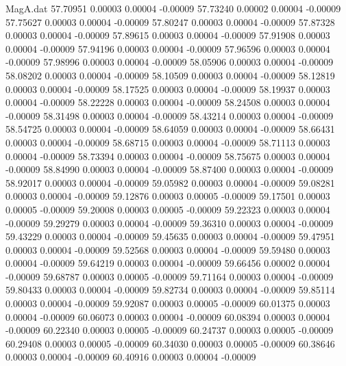 \begin{filecontents}{MagA.dat}
  57.70951    0.00003    0.00004   -0.00009
  57.73240    0.00002    0.00004   -0.00009
  57.75627    0.00003    0.00004   -0.00009
  57.80247    0.00003    0.00004   -0.00009
  57.87328    0.00003    0.00004   -0.00009
  57.89615    0.00003    0.00004   -0.00009
  57.91908    0.00003    0.00004   -0.00009
  57.94196    0.00003    0.00004   -0.00009
  57.96596    0.00003    0.00004   -0.00009
  57.98996    0.00003    0.00004   -0.00009
  58.05906    0.00003    0.00004   -0.00009
  58.08202    0.00003    0.00004   -0.00009
  58.10509    0.00003    0.00004   -0.00009
  58.12819    0.00003    0.00004   -0.00009
  58.17525    0.00003    0.00004   -0.00009
  58.19937    0.00003    0.00004   -0.00009
  58.22228    0.00003    0.00004   -0.00009
  58.24508    0.00003    0.00004   -0.00009
  58.31498    0.00003    0.00004   -0.00009
  58.43214    0.00003    0.00004   -0.00009
  58.54725    0.00003    0.00004   -0.00009
  58.64059    0.00003    0.00004   -0.00009
  58.66431    0.00003    0.00004   -0.00009
  58.68715    0.00003    0.00004   -0.00009
  58.71113    0.00003    0.00004   -0.00009
  58.73394    0.00003    0.00004   -0.00009
  58.75675    0.00003    0.00004   -0.00009
  58.84990    0.00003    0.00004   -0.00009
  58.87400    0.00003    0.00004   -0.00009
  58.92017    0.00003    0.00004   -0.00009
  59.05982    0.00003    0.00004   -0.00009
  59.08281    0.00003    0.00004   -0.00009
  59.12876    0.00003    0.00005   -0.00009
  59.17501    0.00003    0.00005   -0.00009
  59.20008    0.00003    0.00005   -0.00009
  59.22323    0.00003    0.00004   -0.00009
  59.29279    0.00003    0.00004   -0.00009
  59.36310    0.00003    0.00004   -0.00009
  59.43229    0.00003    0.00004   -0.00009
  59.45635    0.00003    0.00004   -0.00009
  59.47951    0.00003    0.00004   -0.00009
  59.52568    0.00003    0.00004   -0.00009
  59.59480    0.00003    0.00004   -0.00009
  59.64219    0.00003    0.00004   -0.00009
  59.66456    0.00002    0.00004   -0.00009
  59.68787    0.00003    0.00005   -0.00009
  59.71164    0.00003    0.00004   -0.00009
  59.80433    0.00003    0.00004   -0.00009
  59.82734    0.00003    0.00004   -0.00009
  59.85114    0.00003    0.00004   -0.00009
  59.92087    0.00003    0.00005   -0.00009
  60.01375    0.00003    0.00004   -0.00009
  60.06073    0.00003    0.00004   -0.00009
  60.08394    0.00003    0.00004   -0.00009
  60.22340    0.00003    0.00005   -0.00009
  60.24737    0.00003    0.00005   -0.00009
  60.29408    0.00003    0.00005   -0.00009
  60.34030    0.00003    0.00005   -0.00009
  60.38646    0.00003    0.00004   -0.00009
  60.40916    0.00003    0.00004   -0.00009

\end{filecontents}
